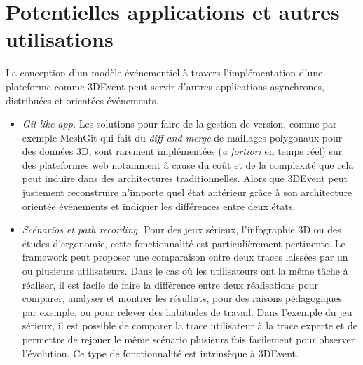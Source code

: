 \section{Potentielles applications et autres utilisations}
La conception d'un modèle événementiel à travers l'implémentation d'une plateforme 
comme 3DEvent peut servir d'autres applications 
asynchrones, distribuées et orientées événements.
\begin{itemize}
	\item \textit{Git-like app.} Les solutions pour faire de la gestion de version, comme 
	par exemple
 	Mesh\-Git \cite{Denning2013} qui fait du
	\textit{diff and merge} de maillages polygonaux pour des données \gls{3D}, 
	sont rarement implémentées (\textit{a fortiori} en 
	temps réel) sur des plateformes web notamment à cause du coût et de la complexité que 
	cela peut induire dans des architectures traditionnelles. Alors que 3DEvent peut justement
	reconstruire n'importe quel état antérieur grâce à son architecture orientée 
	événements et indiquer les différences entre deux états.
	
	\item \textit{Scénarios et \textit{path recording}.} Pour des jeux sérieux, l'infographie 
	3D ou des études d'ergonomie, cette fonctionnalité est particulièrement 
	pertinente. Le \gls{framework} peut proposer une comparaison entre deux traces 
	laissées par un ou plusieurs utilisateurs. Dans le cas où les utilisateurs ont la 
	même tâche à réaliser, il est facile de faire la différence entre deux réalisations 
	pour comparer, analyser et montrer les résultats, pour des raisons 
	pédagogiques par exemple, ou pour relever des habitudes de travail. Dans 
	l'exemple du jeu sérieux, il est possible de comparer la trace utilisateur à la trace experte 
	et de permettre de rejouer le même scénario plusieurs fois facilement pour 
	observer l'évolution. Ce type de fonctionnalité est intrinsèque à 3DEvent. 
	

\end{itemize}
